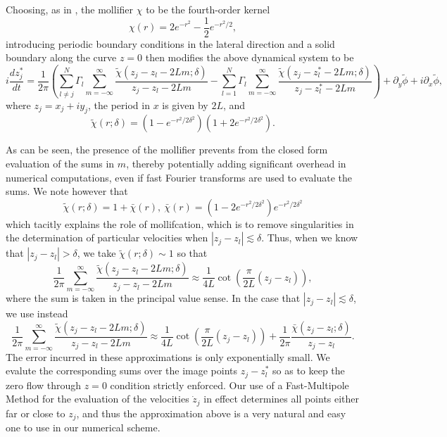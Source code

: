\documentclass[a4paper,11pt]{article}
\newcommand{\p}{\partial}
\begin{document}
Choosing, as in \cite{beale}, the mollifier $\chi$ to be the fourth-order kernel 
\[
\chi(r) = 2e^{-r^{2}} - \frac{1}{2}e^{-r^2/2}, 
\]
introducing periodic boundary conditions in the lateral direction and a solid boundary along the curve $z=0$ then modifies the above dynamical system to be 
\[
i\frac{d z^{\ast}_{j}}{dt}  = \frac{1}{2\pi}\left(\sum_{l\neq j}^{N} \Gamma_{l} \sum_{m=-\infty}^{\infty} \frac{\tilde{\chi}(z_{j}-z_{l}-2Lm;\delta)}{z_{j}-z_{l}-2Lm} -   \sum_{l=1}^{N} \Gamma_{l} \sum_{m=-\infty}^{\infty} \frac{\tilde{\chi}(z_{j}-z^{\ast}_{l}-2Lm;\delta)}{z_{j}-z^{\ast}_{l}-2Lm}\right)  + \p_{y}\tilde{\phi} + i\p_{x}\tilde{\phi}, 
\]
where $z_{j}=x_{j} + iy_{j}$, the period in $x$ is given by $2L$, and
\[
\tilde{\chi}(r;\delta) = \left(1-e^{-r^{2}/2\delta^{2}} \right)\left(1+2e^{-r^{2}/2\delta^{2}} \right).
\]

As can be seen, the presence of the mollifier prevents from the closed form evaluation of the sums in $m$, thereby potentially adding significant overhead in numerical computations, even if fast Fourier transforms are used to evaluate the sums.  We note however that 
\[
\tilde{\chi}(r;\delta) = 1 + \bar{\chi}(r), ~ \bar{\chi}(r) = \left(1-2e^{-r^2/2\delta^{2}} \right)e^{-r^2/2\delta^{2}}
\]
which tacitly explains the role of mollifcation, which is to remove singularities in the determination of particular velocities when $\left|z_{j}-z_{l} \right|\lesssim \delta$.  Thus, when we know that $\left|z_{j}-z_{l} \right| > \delta$, we take $\tilde{\chi}(r;\delta) \sim 1$ so that 
\[
\frac{1}{2\pi}\sum_{m=-\infty}^{\infty} \frac{\tilde{\chi}(z_{j}-z_{l}-2Lm;\delta)}{z_{j}-z_{l}-2Lm} \approx \frac{1}{4L}\cot\left(\frac{\pi}{2L}\left(z_{j}-z_{l}\right) \right),
\]
where the sum is taken in the principal value sense.  In the case that $\left|z_{j}-z_{l} \right|\lesssim \delta$, we use instead 
\[
\frac{1}{2\pi}\sum_{m=-\infty}^{\infty} \frac{\tilde{\chi}(z_{j}-z_{l}-2Lm;\delta)}{z_{j}-z_{l}-2Lm} \approx \frac{1}{4L}\cot\left(\frac{\pi}{2L}\left(z_{j}-z_{l}\right) \right) + \frac{1}{2\pi}\frac{\bar{\chi}(z_{j}-z_{l};\delta)}{z_{j}-z_{l}}.
\]
The error incurred in these approximations is only exponentially small.  We evalute the corresponding sums over the image points $z_{j}-z_{l}^{\ast}$ so as to keep the zero flow through $z=0$ condition strictly enforced.  Our use of a Fast-Multipole Method for the evaluation of the velocities $\dot{z}_{j}$ in effect determines all points either far or close to $z_{j}$, and thus the approximation above is a very natural and easy one to use in our numerical scheme.  
\end{document}

